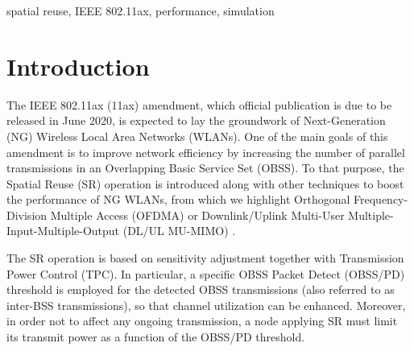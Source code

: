 \documentclass[conference]{IEEEtran}
\begin{document}
	\begin{IEEEkeywords}
		spatial reuse, IEEE 802.11ax, performance, simulation
	\end{IEEEkeywords}
	
	\section{Introduction}
	
	The IEEE 802.11ax (11ax) amendment, which official publication is due to be released in June 2020, is expected to lay the groundwork of Next-Generation (NG) Wireless Local Area Networks (WLANs). One of the main goals of this amendment is to improve network efficiency by increasing the number of parallel transmissions in an Overlapping Basic Service Set (OBSS). To that purpose, the Spatial Reuse (SR) operation is introduced along with other techniques to boost the performance of NG WLANs, from which we highlight Orthogonal Frequency-Division Multiple Access (OFDMA) or Downlink/Uplink Multi-User  Multiple-Input-Multiple-Output (DL/UL MU-MIMO) \cite{bellalta2016ieee}.
	
	The SR operation is based on sensitivity adjustment together with Transmission Power Control (TPC). In particular, a specific OBSS Packet Detect (OBSS/PD) threshold is employed for the detected OBSS transmissions (also referred to as inter-BSS transmissions), so that channel utilization can be enhanced. Moreover, in order not to affect any ongoing transmission, a node applying SR must limit its transmit power as a function of the OBSS/PD threshold.
	
\end{document}
